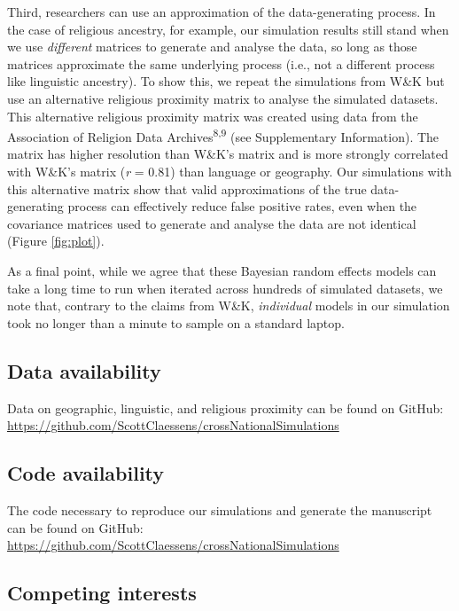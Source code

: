 \documentclass[
  11pt,
]{article}
\begin{document}
Third, researchers can use an approximation of the data-generating process. In
the case of religious ancestry, for example, our simulation results still stand
when we use \emph{different} matrices to generate and analyse the data, so long as
those matrices approximate the same underlying process (i.e., not a different
process like linguistic ancestry). To show this, we repeat the simulations from
W\&K but use an alternative religious proximity matrix to analyse the simulated
datasets. This alternative religious proximity matrix was created using data
from the Association of Religion Data Archives\textsuperscript{8,9} (see
Supplementary Information). The matrix has higher resolution than W\&K's matrix
and is more strongly correlated with W\&K's matrix (\emph{r} =
0.81)
than language or geography. Our simulations with this alternative matrix show
that valid approximations of the true data-generating process can effectively
reduce false positive rates, even when the covariance matrices used to generate
and analyse the data are not identical (Figure \ref{fig:plot}).

As a final point, while we agree that these Bayesian random effects models can
take a long time to run when iterated across hundreds of simulated datasets, we
note that, contrary to the claims from W\&K, \emph{individual} models in our
simulation took no longer than a minute to sample on a standard laptop.

\nolinenumbers

\subsection*{Data availability}

Data on geographic, linguistic, and religious proximity can be found on
GitHub: \url{https://github.com/ScottClaessens/crossNationalSimulations}

\subsection*{Code availability}

The code necessary to reproduce our simulations and generate the manuscript can
be found on GitHub: \url{https://github.com/ScottClaessens/crossNationalSimulations}

\subsection*{Competing interests}
\end{document}
